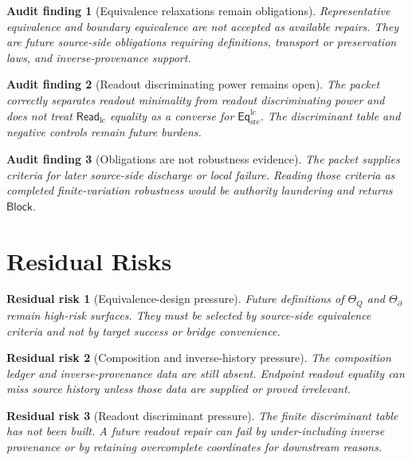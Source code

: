 \documentclass[11pt]{article}
\newcommand{\EqLC}{\mathsf{Eq}_{\mathrm{src}}^{\mathrm{lc}}}
\newcommand{\ReadLC}{\mathsf{Read}_{\mathrm{lc}}}
\newcommand{\Block}{\mathsf{Block}}
\newtheorem{auditfinding}{Audit finding}
\newtheorem{residualrisk}{Residual risk}
\begin{document}
\begin{auditfinding}[Equivalence relaxations remain obligations]
Representative equivalence and boundary equivalence are not accepted as
available repairs. They are future source-side obligations requiring
definitions, transport or preservation laws, and inverse-provenance
support.
\end{auditfinding}

\begin{auditfinding}[Readout discriminating power remains open]
The packet correctly separates readout minimality from readout
discriminating power and does not treat \(\ReadLC\) equality as a
converse for \(\EqLC\). The discriminant table and negative controls
remain future burdens.
\end{auditfinding}

\begin{auditfinding}[Obligations are not robustness evidence]
The packet supplies criteria for later source-side discharge or local
failure. Reading those criteria as completed finite-variation
robustness would be authority laundering and returns \(\Block\).
\end{auditfinding}

\section{Residual Risks}

\begin{residualrisk}[Equivalence-design pressure]
Future definitions of \(\Theta_Q\) and \(\Theta_{\partial}\) remain
high-risk surfaces. They must be selected by source-side equivalence
criteria and not by target success or bridge convenience.
\end{residualrisk}

\begin{residualrisk}[Composition and inverse-history pressure]
The composition ledger and inverse-provenance data are still absent.
Endpoint readout equality can miss source history unless those data are
supplied or proved irrelevant.
\end{residualrisk}

\begin{residualrisk}[Readout discriminant pressure]
The finite discriminant table has not been built. A future readout
repair can fail by under-including inverse provenance or by retaining
overcomplete coordinates for downstream reasons.
\end{residualrisk}
\end{document}
